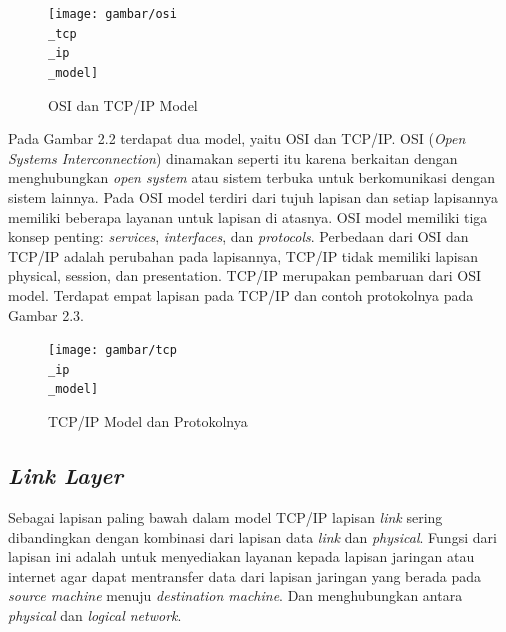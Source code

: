 \begin{figure}[H]
  \centering{}
	\texttt{[image: gambar/osi\\\_tcp\\\_ip\\\_model]}
  \caption{OSI dan TCP/IP Model}
\end{figure}

Pada Gambar 2.2 terdapat dua model, yaitu OSI dan TCP/IP. OSI (\emph{Open Systems Interconnection}) dinamakan seperti itu karena berkaitan dengan menghubungkan \emph{open system} atau sistem terbuka untuk berkomunikasi dengan sistem lainnya. Pada OSI model terdiri dari tujuh lapisan dan setiap lapisannya memiliki beberapa layanan untuk lapisan di atasnya. OSI model memiliki tiga konsep penting: \emph{services}, \emph{interfaces}, dan \emph{protocols}. Perbedaan dari OSI dan TCP/IP adalah perubahan pada lapisannya, TCP/IP tidak memiliki lapisan physical, session, dan presentation. TCP/IP merupakan pembaruan dari OSI model. Terdapat empat lapisan pada TCP/IP dan contoh protokolnya pada Gambar 2.3.

\begin{figure}[H]
  \centering{}
	\texttt{[image: gambar/tcp\\\_ip\\\_model]}
  \caption{TCP/IP Model dan Protokolnya}
\end{figure}

\subsection{\emph{Link Layer}}

Sebagai lapisan paling bawah dalam model TCP/IP lapisan \emph{link} sering dibandingkan dengan kombinasi dari lapisan data \emph{link} dan \emph{physical}. Fungsi dari lapisan ini adalah untuk menyediakan layanan kepada lapisan jaringan atau internet agar dapat mentransfer data dari lapisan jaringan yang berada pada \emph{source machine} menuju \emph{destination machine}. Dan menghubungkan antara \emph{physical} dan \emph{logical network}.



